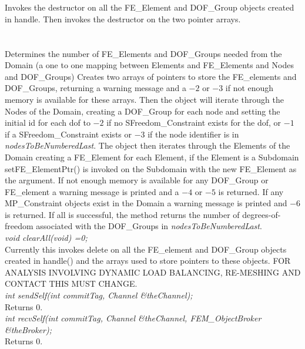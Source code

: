  \\
\\ 
Invokes the destructor on all the FE\_Element and DOF\_Group objects
created in \p handle. Then invokes the destructor on the two
pointer arrays. \\

\\
 \\
Determines the number of FE\_Elements and DOF\_Groups needed from the
Domain (a one to one mapping between Elements and FE\_Elements and
Nodes and DOF\_Groups) Creates two arrays of pointers to store the
FE\_elements and DOF\_Groups, returning a warning message and a $-2$
or $-3$ if not enough memory is available for these arrays. Then the
object will iterate through the Nodes of the Domain, creating a
DOF\_Group for each node and setting the initial id for each dof to
$-2$ if no SFreedom\_Constraint exists for the dof, or $-1$ if a
SFreedom\_Constraint exists or $-3$ if the node identifier is in {\em
nodesToBeNumberedLast}. The object then iterates through the Elements
of the Domain creating a FE\_Element for each Element, if the Element
is a Subdomain setFE\_ElementPtr() is invoked on the Subdomain
with the new FE\_Element as the argument. If not enough memory is
available for any DOF\_Group or FE\_element a warning message is
printed and a $-4$ or $-5$ is returned. If any MP\_Constraint objects
exist in the Domain a warning message is printed and $-6$ is
returned. If all is successful, the method returns the number of
degrees-of-freedom associated with the DOF\_Groups in {\em
nodesToBeNumberedLast}. \\ 

{\em void clearAll(void) =0;} \\
Currently this invokes delete on all the FE\_element and DOF\_Group
objects created in handle() and the arrays used to store
pointers to these objects. FOR ANALYSIS INVOLVING DYNAMIC LOAD
BALANCING, RE-MESHING AND CONTACT THIS MUST CHANGE. \\

{\em int sendSelf(int commitTag, Channel \&theChannel); } \\
Returns $0$. \\

{\em int recvSelf(int commitTag, Channel \&theChannel, FEM\_ObjectBroker
\&theBroker); } \\
Returns $0$. 

